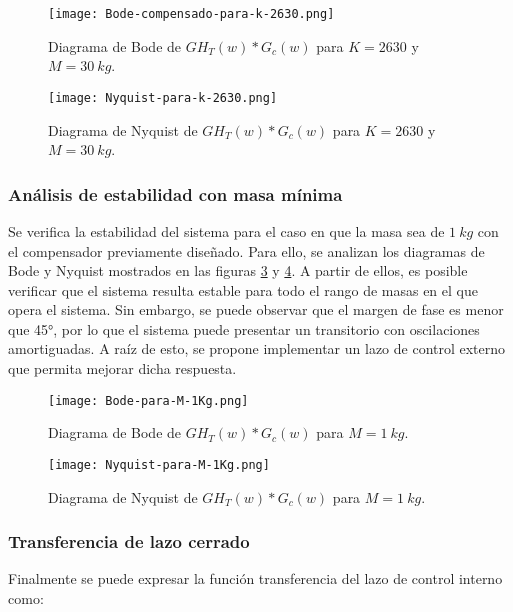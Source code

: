 \begin{figure}[H]
	\centering
	\texttt{[image: Bode-compensado-para-k-2630.png]}
	\caption{Diagrama de Bode de $GH_T(w)*G_c(w)$ para $K=2630$ y $M=30\:kg$.}
	\label{fig:bode-compensado-para-k-2630}
\end{figure}

\begin{figure}[H]
	\centering
	\texttt{[image: Nyquist-para-k-2630.png]}
	\caption{Diagrama de Nyquist de $GH_T(w)*G_c(w)$ para $K=2630$ y $M=30\:kg$.}
	\label{fig:nyquist-para-k-2630}
\end{figure}

\subsubsection{Análisis de estabilidad con masa mínima}


Se verifica la estabilidad del sistema  para el caso en que la masa sea de $1\:kg$ con el compensador previamente diseñado. Para ello, se analizan los diagramas de Bode y Nyquist mostrados en las figuras \ref{fig:bode-para-M-1Kg} y \ref{fig:nyquist-para-M-1Kg}. A partir de ellos, es posible verificar que el sistema resulta estable para todo el rango de masas en el que opera el sistema. Sin embargo, se puede observar que el margen de fase es menor que 45°, por lo que el sistema puede presentar un transitorio con oscilaciones amortiguadas. A raíz de esto, se propone implementar un lazo de control externo que permita mejorar dicha respuesta.


\begin{figure}[H]
	\centering
	\texttt{[image: Bode-para-M-1Kg.png]}
	\caption{Diagrama de Bode de $GH_T(w)*G_c(w)$ para $M=1\:kg$.}
	\label{fig:bode-para-M-1Kg}
\end{figure}

\begin{figure}[H]
	\centering
	\texttt{[image: Nyquist-para-M-1Kg.png]}
	\caption{Diagrama de Nyquist de $GH_T(w)*G_c(w)$ para $M=1\:kg$.}
	\label{fig:nyquist-para-M-1Kg}
\end{figure}

\subsubsection{Transferencia de lazo cerrado}

Finalmente se puede expresar la función transferencia del lazo de control interno como:
%


